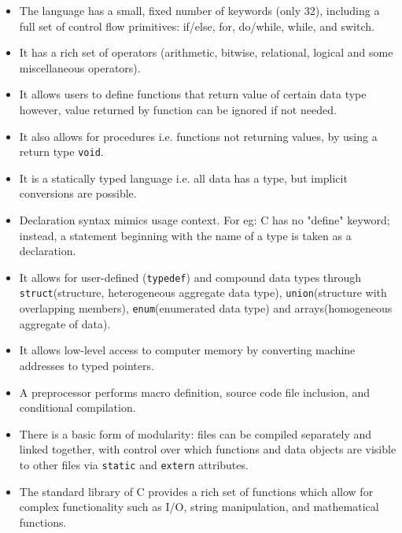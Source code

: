 \documentclass[report]{subfiles}
\begin{document}
    \begin{itemize}
        \item{The language has a small, fixed number of keywords (only 32), including a full set of control flow primitives: if/else, for, do/while, while, and switch.}
        \item{It has a rich set of operators (arithmetic, bitwise, relational, logical and some miscellaneous operators).}
        \item{It allows users to define functions that return value of certain data type however, value returned by function can be ignored if not needed.}
        \item{It also allows for procedures i.e. functions not returning values, by using a return type \texttt{void}.}
        \item{It is a statically typed language i.e. all data has a type, but implicit conversions are possible.}
        \item{Declaration syntax mimics usage context. For eg: C has no "define" keyword; instead, a statement beginning with the name of a type is taken as a declaration.}
        \item{It allows for user-defined (\texttt{typedef}) and compound data types through \texttt{struct}(structure, heterogeneous aggregate data type), \texttt{union}(structure with overlapping members), \texttt{enum}(enumerated data type) and arrays(homogeneous aggregate of data).}
        \item{It allows low-level access to computer memory by converting machine addresses to typed pointers.}
        \item{A preprocessor performs macro definition, source code file inclusion, and conditional compilation.}
        \item{There is a basic form of modularity: files can be compiled separately and linked together, with control over which functions and data objects are visible to other files via \texttt{static} and \texttt{extern} attributes.}
        \item{The standard library of C provides a rich set of functions which allow for complex functionality such as I/O, string manipulation, and mathematical functions.}
    \end{itemize}
\end{document}
